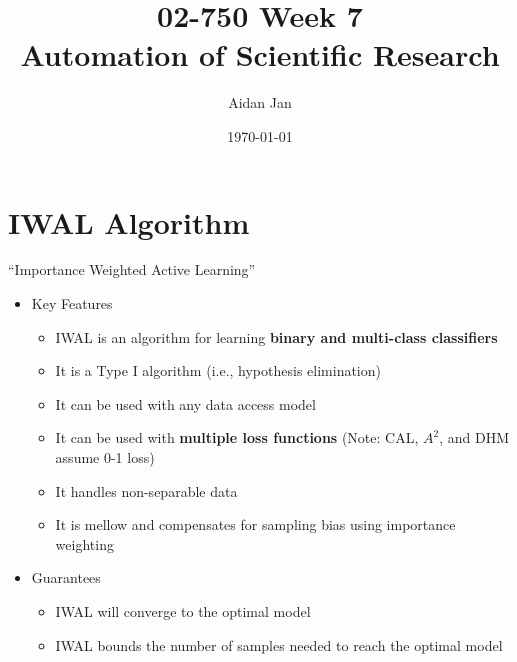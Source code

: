 \documentclass[10pt]{article}
\title{02-750 Week 7 \\ \large{Automation of Scientific Research}}
\author{Aidan Jan}
\date{\today}
\begin{document}
\maketitle

\section*{IWAL Algorithm}
``Importance Weighted Active Learning''
\begin{itemize}
	\item Key Features
	\begin{itemize}
	    \item IWAL is an algorithm for learning \textbf{binary and multi-class classifiers}
	    \item It is a Type I algorithm (i.e., hypothesis elimination)
	    \item It can be used with any data access model
	    \item It can be used with \textbf{multiple loss functions} (Note: CAL, $A^2$, and DHM assume 0-1 loss)
	    \item It handles non-separable data
	    \item It is mellow and compensates for sampling bias using importance weighting
    \end{itemize}
	\item Guarantees
	\begin{itemize}
	    \item IWAL will converge to the optimal model
	    \item IWAL bounds the number of samples needed to reach the optimal model
    \end{itemize}   
\end{itemize}
\end{document}
